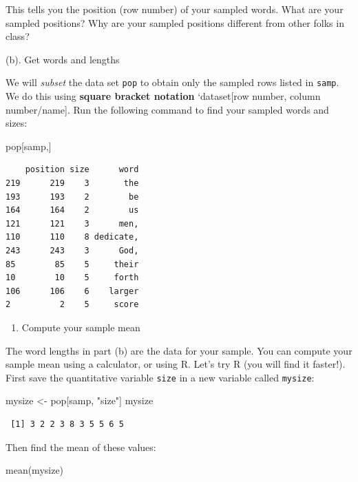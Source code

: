 \documentclass[
]{book}
\newenvironment{Shaded}{\begin{snugshade}}{\end{snugshade}}
\newcommand{\FunctionTok}[1]{\textcolor[rgb]{0.00,0.00,0.00}{#1}}
\newcommand{\NormalTok}[1]{#1}
\newcommand{\OtherTok}[1]{\textcolor[rgb]{0.56,0.35,0.01}{#1}}
\newcommand{\StringTok}[1]{\textcolor[rgb]{0.31,0.60,0.02}{#1}}
\providecommand{\tightlist}{%
  \setlength{\itemsep}{0pt}\setlength{\parskip}{0pt}}
\begin{document}
This tells you the position (row number) of your sampled words. What are your sampled positions? Why are your sampled positions different from other folks in class?

(b). Get words and lengths

We will \emph{subset} the data set \texttt{pop} to obtain only the sampled rows listed in \texttt{samp}. We do this using \textbf{square bracket notation} `dataset{[}row number, column number/name{]}. Run the following command to find your sampled words and sizes:

\begin{Shaded}
\begin{Highlighting}[]
\NormalTok{pop[samp,]}
\end{Highlighting}
\end{Shaded}

\begin{verbatim}
    position size      word
219      219    3       the
193      193    2        be
164      164    2        us
121      121    3      men,
110      110    8 dedicate,
243      243    3      God,
85        85    5     their
10        10    5     forth
106      106    6    larger
2          2    5     score
\end{verbatim}

\begin{enumerate}
\def\labelenumi{\alph{enumi}.}
\setcounter{enumi}{2}
\tightlist
\item
  Compute your sample mean
\end{enumerate}

The word lengths in part (b) are the data for your sample. You can compute your sample mean using a calculator, or using R. Let's try R (you will find it faster!). First save the quantitative variable \texttt{size} in a new variable called \texttt{mysize}:

\begin{Shaded}
\begin{Highlighting}[]
\NormalTok{mysize }\OtherTok{\textless{}{-}}\NormalTok{ pop[samp, }\StringTok{"size"}\NormalTok{]}
\NormalTok{mysize}
\end{Highlighting}
\end{Shaded}

\begin{verbatim}
 [1] 3 2 2 3 8 3 5 5 6 5
\end{verbatim}

Then find the mean of these values:

\begin{Shaded}
\begin{Highlighting}[]
\FunctionTok{mean}\NormalTok{(mysize)}
\end{Highlighting}
\end{Shaded}
\end{document}
